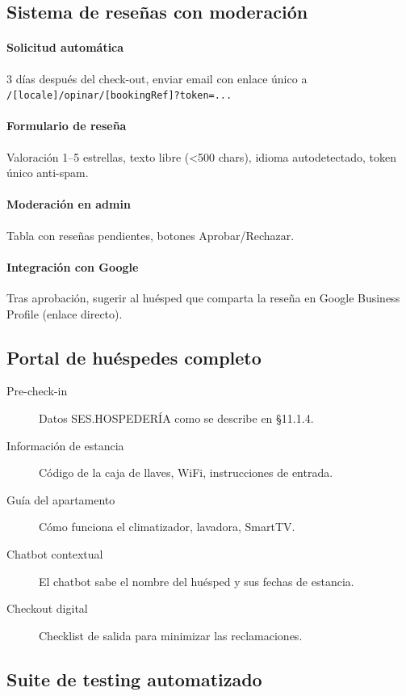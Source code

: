 \documentclass[12pt,a4paper,twoside,openright]{report}
\begin{document}
\subsection{Sistema de reseñas con moderación}

\paragraph{Solicitud automática} 3 días después del check-out, enviar email con
enlace único a \texttt{/[locale]/opinar/[bookingRef]?token=...}

\paragraph{Formulario de reseña} Valoración 1--5 estrellas, texto libre (\textless 500 chars),
idioma autodetectado, token único anti-spam.

\paragraph{Moderación en admin} Tabla con reseñas pendientes, botones Aprobar/Rechazar.

\paragraph{Integración con Google} Tras aprobación, sugerir al huésped que comparta la
reseña en Google Business Profile (enlace directo).

\subsection{Portal de huéspedes completo}

\begin{description}
  \item[Pre-check-in] Datos SES.HOSPEDERÍA como se describe en §11.1.4.
  \item[Información de estancia] Código de la caja de llaves, WiFi, instrucciones de entrada.
  \item[Guía del apartamento] Cómo funciona el climatizador, lavadora, SmartTV.
  \item[Chatbot contextual] El chatbot sabe el nombre del huésped y sus fechas de estancia.
  \item[Checkout digital] Checklist de salida para minimizar las reclamaciones.
\end{description}

\subsection{Suite de testing automatizado}
\end{document}

